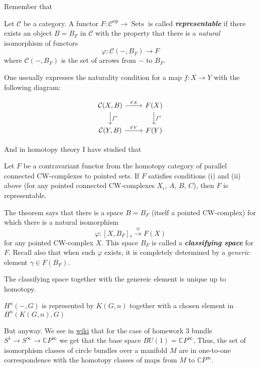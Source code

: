 Remember that
\begin{defn}
	Let $\mathcal{C}$ be a category. A functor $F:\mathcal{C}^{\operatorname{op}}\to \operatorname{Sets}$ is called \textit{\textbf{representable}} if there exists an object $B=B_{F}$ in $\mathcal{C}$ with the property that there is a \textit{natural} isomorphism of functors
	\[\varphi:\mathcal{C}(-,B_{F})\to F\]
	where $\mathcal{C}(-,B_{F})$ is the set of arrows from $-$ to $B_{F}$.

	One ussually expresses the naturality condition for a map $f:X\to Y$ with the following diagram:

	\[\begin{tikzcd}
		\mathcal{C}(X,B)\arrow[r,"\varphi_{X}"]\arrow[d,"f^{*}"]&F(X)\arrow[d,"f^{*}"]\\
		\mathcal{C}(Y,B)\arrow[r,"\varphi_{Y}"]&F(Y)
	\end{tikzcd}\]
\end{defn}

And in homotopy theory I have studied that

\begin{thm}
	Let $F$ be a contravariant functor from the homotopy category of parallel connected CW-complexes to pointed sets. If $F$ satisfies conditions (i) and (ii) above (for any pointed connected CW-complexes $X_{i}$, $A$, $B$, $C$), then $F$ is representable.
\end{thm}

\begin{remark}
	The theorem says that there is a space $B=B_{F}$ (itself a pointed CW-complex) for which there is a natural isomorphism
	\[\varphi :[X,B_{F}]_{*}\overset{\cong }{\longrightarrow}F(X)\]
	for any pointed CW-complex $X$. This space $B_{F}$ is called a \textit{\textbf{classifying space}} for $F$. Recall also that when such $\varphi$ exists, it is completely determined by a \textit{generic} element $\gamma\in F(B_{F})$.

	The classifying space together with the genereic element is unique up to homotopy.
\end{remark}

\begin{remark}
	$H^{n}(-,G)$ is represented by  $K(G,n)$ together with a chosen element in $H^{n}(K(G,n),G)$
\end{remark}

But anyway. We see in \href{https://en.wikipedia.org/wiki/Classifying_space_for_U(n)#Case_of_line_bundles}{wiki} that for the case of homework 3 bundle  $S^1\to S^\infty\to \mathbb{C}P^\infty$ we get that the base space $BU(1)=\mathbb{C}P^\infty$, Thus, the set of isomorphism classes of circle bundles over a manifold $M$ are in one-to-one correspondence with the homotopy classes of maps from $M$ to $\mathbb{C}P^\infty$.

